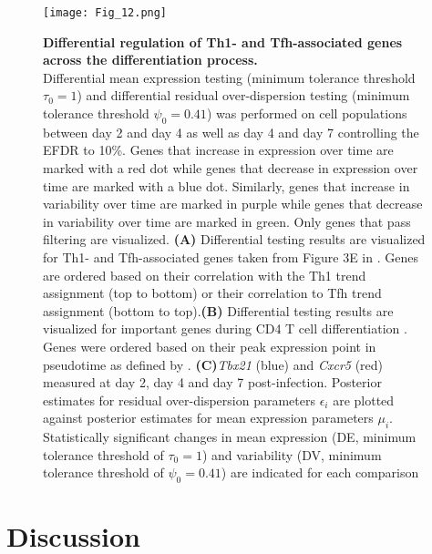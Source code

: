 \newpage

\begin{figure}[!h]
  \begin{minipage}[c]{0.57\textwidth}
    \texttt{[image: Fig\_12.png]}
  \end{minipage}\hfill
  \begin{minipage}[c]{0.4\textwidth}
\caption[Differential regulation of lineage-associated genes across differentiation]{\textbf{Differential regulation of Th1- and Tfh-associated genes across the differentiation process.}\\
Differential mean expression testing (minimum tolerance threshold $\tau_0=1$) and differential residual over-dispersion testing (minimum tolerance threshold $\psi_0=0.41$) was performed on cell populations between day 2 and day 4 as well as day 4 and day 7 controlling the EFDR to 10\%. Genes that increase in expression over time are marked with a red dot while genes that decrease in expression over time are marked with a blue dot. Similarly, genes that increase in variability over time are marked in purple while genes that decrease in variability over time are marked in green. Only genes that pass filtering are visualized. \textbf{(A)} Differential testing results are visualized for Th1- and Tfh-associated genes taken from Figure 3E in \cite{Lonnberg2017}. Genes are ordered based on their correlation with the Th1 trend assignment (top to bottom) or their correlation to Tfh trend assignment (bottom to top).\textbf{(B)} Differential testing results are visualized for important genes during CD4\plus{} T cell differentiation \citep[taken from Figure 5A in][]{Lonnberg2017}. Genes were ordered based on their peak expression point in pseudotime as defined by \cite{Lonnberg2017}. \textbf{(C)}\textit{Tbx21} (blue) and \textit{Cxcr5} (red) measured at day 2, day 4 and day 7 post-infection. Posterior estimates for residual over-dispersion parameters $\epsilon_i$ are plotted against posterior estimates for mean expression parameters $\mu_i$. Statistically significant changes in mean expression (DE, minimum tolerance threshold of $\tau_0=1$) and variability (DV, minimum tolerance threshold of $\psi_0=0.41$) are indicated for each comparison} \label{fig2:immune_differentiation2}
  \end{minipage}
\end{figure}

\newpage


\section{Discussion}

